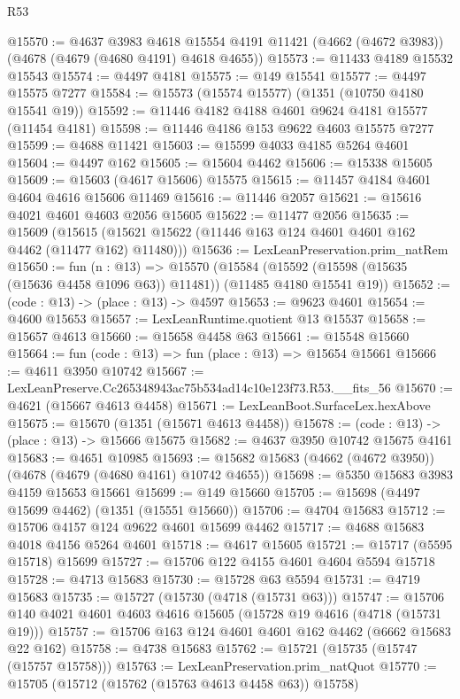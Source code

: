 \begin{lexlean}{R53}
\begin{coremodule}
@15570 := @4637
    @3983
    @4618
    @15554
    @4191
    @11421
    (@4662 (@4672 @3983))
    (@4678 (@4679 (@4680 @4191) @4618 @4655))
@15573 := @11433 @4189 @15532 @15543
@15574 := @4497 @4181
@15575 := @149 @15541
@15577 := @4497 @15575 @7277
@15584 := @15573 (@15574 @15577) (@1351 (@10750 @4180 @15541 @19))
@15592 := @11446 @4182 @4188 @4601 @9624 @4181 @15577 (@11454 @4181)
@15598 := @11446 @4186 @153 @9622 @4603 @15575 @7277
@15599 := @4688 @11421
@15603 := @15599 @4033 @4185 @5264 @4601
@15604 := @4497 @162
@15605 := @15604 @4462
@15606 := @15338 @15605
@15609 := @15603 (@4617 @15606) @15575
@15615 := @11457 @4184 @4601 @4604 @4616 @15606 @11469
@15616 := @11446 @2057
@15621 := @15616 @4021 @4601 @4603 @2056 @15605
@15622 := @11477 @2056
@15635 := @15609
    (@15615 (@15621 @15622 (@11446 @163 @124 @4601 @4601 @162 @4462 (@11477 @162) @11480)))
@15636 := LexLeanPreservation.prim_natRem
@15650 := fun (n : @13) =>
  @15570
    (@15584 (@15592 (@15598 (@15635 (@15636 @4458 @1096 @63)) @11481)) (@11485 @4180 @15541 @19))
@15652 := (code : @13) -> (place : @13) -> @4597
@15653 := @9623 @4601
@15654 := @4600 @15653
@15657 := LexLeanRuntime.quotient @13 @15537
@15658 := @15657 @4613
@15660 := @15658 @4458 @63
@15661 := @15548 @15660
@15664 := fun (code : @13) => fun (place : @13) => @15654 @15661
@15666 := @4611 @3950 @10742
@15667 := LexLeanPreserve.Cc265348943ac75b534ad14c10e123f73.R53.__fits_56
@15670 := @4621 (@15667 @4613 @4458)
@15671 := LexLeanBoot.SurfaceLex.hexAbove
@15675 := @15670 (@1351 (@15671 @4613 @4458))
@15678 := (code : @13) -> (place : @13) -> @15666 @15675
@15682 := @4637 @3950 @10742 @15675 @4161
@15683 := @4651 @10985
@15693 := @15682 @15683 (@4662 (@4672 @3950)) (@4678 (@4679 (@4680 @4161) @10742 @4655))
@15698 := @5350 @15683 @3983 @4159 @15653 @15661
@15699 := @149 @15660
@15705 := @15698 (@4497 @15699 @4462) (@1351 (@15551 @15660))
@15706 := @4704 @15683
@15712 := @15706 @4157 @124 @9622 @4601 @15699 @4462
@15717 := @4688 @15683 @4018 @4156 @5264 @4601
@15718 := @4617 @15605
@15721 := @15717 (@5595 @15718) @15699
@15727 := @15706 @122 @4155 @4601 @4604 @5594 @15718
@15728 := @4713 @15683
@15730 := @15728 @63 @5594
@15731 := @4719 @15683
@15735 := @15727 (@15730 (@4718 (@15731 @63)))
@15747 := @15706 @140 @4021 @4601 @4603 @4616 @15605 (@15728 @19 @4616 (@4718 (@15731 @19)))
@15757 := @15706 @163 @124 @4601 @4601 @162 @4462 (@6662 @15683 @22 @162)
@15758 := @4738 @15683
@15762 := @15721 (@15735 (@15747 (@15757 @15758)))
@15763 := LexLeanPreservation.prim_natQuot
@15770 := @15705 (@15712 (@15762 (@15763 @4613 @4458 @63)) @15758)

\end{coremodule}
\end{lexlean}
